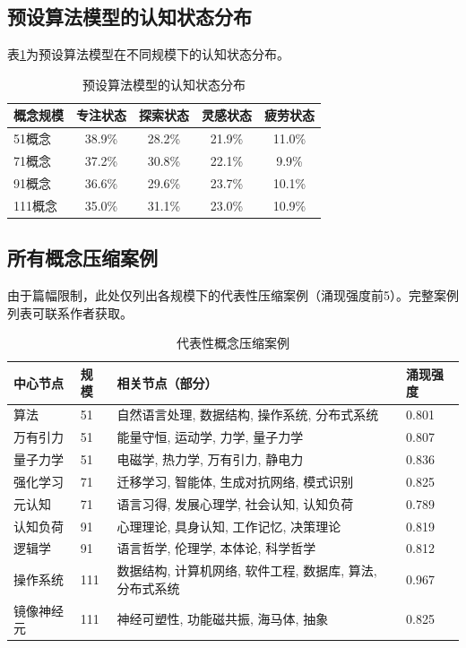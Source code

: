 \documentclass[12pt,a4paper]{article}
\begin{document}
\subsection{预设算法模型的认知状态分布}

表\ref{tab:app_state_dist}为预设算法模型在不同规模下的认知状态分布。

\begin{table}[H]
\centering
\caption{预设算法模型的认知状态分布}
\label{tab:app_state_dist}
\begin{tabular}{lcccc}
\toprule
\textbf{概念规模} & \textbf{专注状态} & \textbf{探索状态} & \textbf{灵感状态} & \textbf{疲劳状态} \\
\midrule
51概念 & 38.9\% & 28.2\% & 21.9\% & 11.0\% \\
71概念 & 37.2\% & 30.8\% & 22.1\% & 9.9\% \\
91概念 & 36.6\% & 29.6\% & 23.7\% & 10.1\% \\
111概念 & 35.0\% & 31.1\% & 23.0\% & 10.9\% \\
\bottomrule
\end{tabular}
\end{table}

\subsection{所有概念压缩案例}

由于篇幅限制，此处仅列出各规模下的代表性压缩案例（涌现强度前5）。完整案例列表可联系作者获取。

\begin{table}[H]
\centering
\caption{代表性概念压缩案例}
\label{tab:app_compression_cases}
\begin{tabular}{p{2.5cm}p{1cm}p{4.5cm}p{2cm}}
\toprule
\textbf{中心节点} & \textbf{规模} & \textbf{相关节点（部分）} & \textbf{涌现强度} \\
\midrule
算法 & 51 & 自然语言处理, 数据结构, 操作系统, 分布式系统 & 0.801 \\
万有引力 & 51 & 能量守恒, 运动学, 力学, 量子力学 & 0.807 \\
量子力学 & 51 & 电磁学, 热力学, 万有引力, 静电力 & 0.836 \\
\addlinespace
强化学习 & 71 & 迁移学习, 智能体, 生成对抗网络, 模式识别 & 0.825 \\
元认知 & 71 & 语言习得, 发展心理学, 社会认知, 认知负荷 & 0.789 \\
\addlinespace
认知负荷 & 91 & 心理理论, 具身认知, 工作记忆, 决策理论 & 0.819 \\
逻辑学 & 91 & 语言哲学, 伦理学, 本体论, 科学哲学 & 0.812 \\
\addlinespace
操作系统 & 111 & 数据结构, 计算机网络, 软件工程, 数据库, 算法, 分布式系统 & 0.967 \\
镜像神经元 & 111 & 神经可塑性, 功能磁共振, 海马体, 抽象 & 0.825 \\
\bottomrule
\end{tabular}
\end{table}
\end{document}
